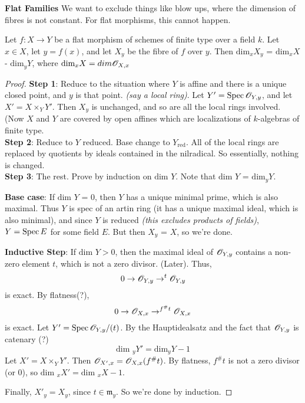 \textbf{Flat Families} We want to exclude things like blow ups,
where the dimension of fibres is not constant. For flat morphisms,
this cannot happen. \begin{proposition} Let $f:X\rightarrow Y$ be
a flat morphism of schemes of finite type over a field $k$. Let $x
\in X$, let $y = f(x)$, and let $X_y$ be the fibre of $f$ over
$y$. Then $\text{dim}_x X_y$ = $\text{dim}_x X$ - $\text{dim}_y
Y$, where $\text{dim}_x X = dim \mathscr{O}_{X,x}$ \end{proposition}
\begin{proof} \textbf{Step 1}: Reduce to the situation where $Y$
is affine and there is a unique closed point, and $y$ is that
point. \emph{(say a local ring)}. Let $Y' = \text{\rm Spec\,}{\mathscr{O}_{Y,y}}$, and
let $X' = X \times_Y Y'$. Then $X_y$ is unchanged, and so are all
the local rings involved. (Now $X$ and $Y$ are covered by open
affines which are
localizations of $k$-algebras of finite type.\\

\textbf{Step 2}: Reduce to $Y$ reduced. Base change to
$Y_{\text{red}}$. All of the local rings are replaced by quotients
by ideals contained in the nilradical. So essentially, nothing is
changed.\\

\textbf{Step 3}: The rest. Prove by induction on $\text{dim } Y$.
Note that $\text{dim } Y$ = $\text{dim}_y Y$.

\textbf{Base case}: If $\text{dim } Y$ = 0, then $Y$ has a unique
minimal prime, which is also maximal.  Thus $Y$ is spec of an
artin ring (it has a unique maximal ideal, which is also minimal),
and since $Y$ is reduced \emph{(this excludes products of
fields)}, $Y = \text{\rm Spec\,}{E}$ for some field $E$. But then $X_y$ = $X$,
so we're done.

\textbf{Inductive Step}: If $\text{dim } Y > 0$, then the maximal
ideal of $\mathscr{O}_{Y,y}$ contains a non-zero element $t$, which is not
a zero divisor. (Later). Thus, \[ 0 \rightarrow \mathscr{O}_{Y,y}
\rightarrow^t \mathscr{O}_{Y,y} \] is exact. By flatness(?), \[ 0
\rightarrow \mathscr{O}_{X,x} \rightarrow^{f^{\#}t} \mathscr{O}_{X,x} \] is exact.
Let $Y' = \text{\rm Spec\,}{\mathscr{O}_{Y,y}/(t)}$. By the Hauptidealsatz and the fact
that $\mathscr{O}_{Y,y}$ is catenary (?) \[ \text{dim }_y Y' = \text{dim
}_y Y -  1 \] Let $X' = X \times_Y Y'$. Then
$\mathscr{O}_{X',x}=\mathscr{O}_{X,x}(f^{\#}t)$. By flatness, $f^{\#}t$ is not a
zero divisor (or 0), so $\text{dim }_x X' = \text{dim }_x X - 1$.

Finally, $X'_y = X_y$, since $t \in \mathfrak{m}_y$. So we're done
by induction. \end{proof}

